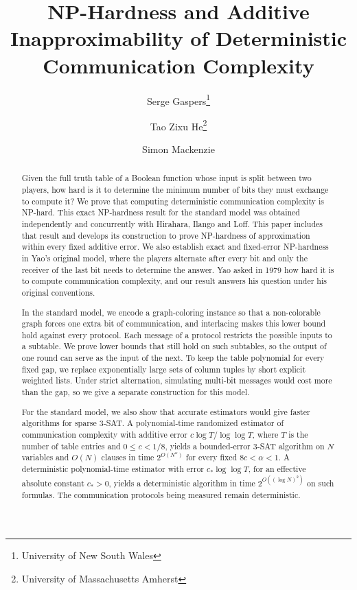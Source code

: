 \documentclass[11pt,letterpaper]{article} \usepackage[utf8]{inputenc}
\theoremstyle{plain} \newtheorem{theorem}{Theorem}[section]
\theoremstyle{definition} \newaliascnt{definition}{theorem}
\begin{document}
\title{NP-Hardness and Additive Inapproximability of Deterministic Communication Complexity}
\author{Serge Gaspers\thanks{University of New South Wales} \and
Tao Zixu He\thanks{University of Massachusetts Amherst} \and
Simon Mackenzie\footnotemark[1]}
\date{}
\hypersetup{pageanchor=false}
\begin{titlepage}
\maketitle
\thispagestyle{empty}

\begin{abstract}
Given the full truth table of a Boolean function whose input is split
between two players, how hard is it to determine the minimum number of
bits they must exchange to compute it? We prove that computing
deterministic communication complexity is NP-hard. This exact NP-hardness result for the standard model was obtained independently and concurrently
with Hirahara, Ilango and Loff. This paper includes that result and
develops its construction to prove NP-hardness of approximation within
every fixed additive error. We also establish exact and fixed-error
NP-hardness in Yao's original model, where the players alternate after
every bit and only the receiver of the last bit needs to determine the
answer. Yao asked in 1979 how hard it is to compute communication complexity,
and our result answers his question under his original conventions.

In the standard model, we encode a graph-coloring instance so that a
non-colorable graph forces one extra bit of communication, and interlacing
makes this lower bound hold against every protocol. Each message of a protocol restricts the possible inputs to a subtable. We prove lower bounds that still hold on such subtables, so the output of one round can serve as the input of the next. To keep the table polynomial
for every fixed gap, we replace exponentially large sets of column tuples
by short explicit weighted lists. Under strict alternation, simulating
multi-bit messages would cost more than the gap, so we give a separate construction for this model.

For the standard model, we also show that accurate estimators would give
faster algorithms for sparse $3$-SAT. A
polynomial-time randomized estimator of communication complexity with additive error
$c\log T/\log\log T$, where $T$ is the number of table entries and
$0\le c<1/8$, yields a bounded-error $3$-SAT algorithm on $N$ variables
and $O(N)$ clauses in time $2^{O(N^\alpha)}$ for every fixed
$8c<\alpha<1$. A deterministic polynomial-time estimator with error
$c_*\log\log T$, for an effective absolute constant $c_*>0$, yields a
deterministic algorithm in time $2^{O((\log N)^2)}$ on such formulas.
The communication protocols being measured remain deterministic.
\end{abstract}

\end{titlepage}
\setcounter{page}{1}
\hypersetup{pageanchor=true}
\end{document}
